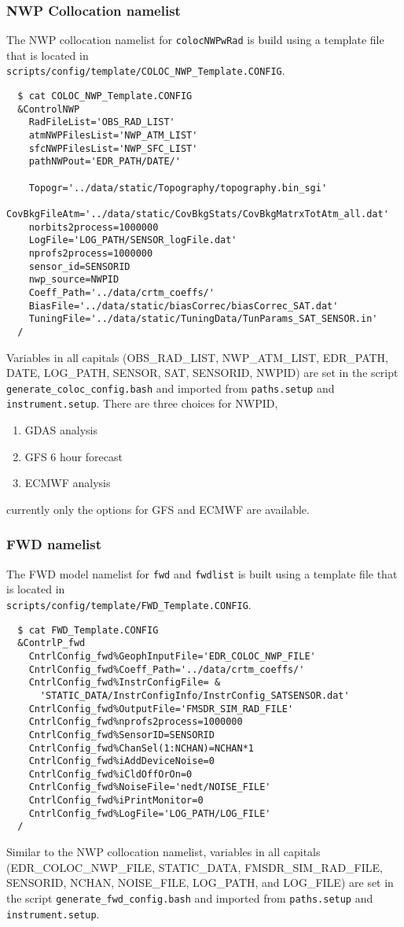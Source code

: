 \documentclass[10pt]{report}
\begin{document}
\subsubsection{NWP Collocation namelist}\label{ssec:NWPColoc}
The NWP collocation namelist for {\tt colocNWPwRad} is build using a template 
file that is located in \\
 {\tt scripts/config/template/COLOC\_NWP\_Template.CONFIG}.
\begin{verbatim}
  $ cat COLOC_NWP_Template.CONFIG
  &ControlNWP
    RadFileList='OBS_RAD_LIST'
    atmNWPFilesList='NWP_ATM_LIST'
    sfcNWPFilesList='NWP_SFC_LIST'
    pathNWPout='EDR_PATH/DATE/'

    Topogr='../data/static/Topography/topography.bin_sgi'
    CovBkgFileAtm='../data/static/CovBkgStats/CovBkgMatrxTotAtm_all.dat'
    norbits2process=1000000
    LogFile='LOG_PATH/SENSOR_logFile.dat'
    nprofs2process=1000000
    sensor_id=SENSORID
    nwp_source=NWPID
    Coeff_Path='../data/crtm_coeffs/'
    BiasFile='../data/static/biasCorrec/biasCorrec_SAT.dat'
    TuningFile='../data/static/TuningData/TunParams_SAT_SENSOR.in'
  /
\end{verbatim}
Variables in all capitals (OBS\_RAD\_LIST, NWP\_ATM\_LIST, EDR\_PATH, DATE, 
LOG\_PATH, SENSOR, SAT, SENSORID, NWPID) are set in the script {\tt generate\_coloc\_config.bash} and imported from {\tt paths.setup} and 
{\tt instrument.setup}.  
There are three choices for NWPID, 
\begin{enumerate}
\item GDAS analysis
\item GFS 6 hour forecast
\item ECMWF analysis
\end{enumerate}
currently only the options for GFS and ECMWF are available.
\subsubsection{FWD namelist}
The FWD model namelist for {\tt fwd} and {\tt fwdlist} is built 
using a template file that is located in \\
 {\tt scripts/config/template/FWD\_Template.CONFIG}.
\begin{verbatim}
  $ cat FWD_Template.CONFIG
  &ContrlP_fwd
    CntrlConfig_fwd%GeophInputFile='EDR_COLOC_NWP_FILE'
    CntrlConfig_fwd%Coeff_Path='../data/crtm_coeffs/'
    CntrlConfig_fwd%InstrConfigFile= &
      'STATIC_DATA/InstrConfigInfo/InstrConfig_SATSENSOR.dat'
    CntrlConfig_fwd%OutputFile='FMSDR_SIM_RAD_FILE'
    CntrlConfig_fwd%nprofs2process=1000000
    CntrlConfig_fwd%SensorID=SENSORID
    CntrlConfig_fwd%ChanSel(1:NCHAN)=NCHAN*1
    CntrlConfig_fwd%iAddDeviceNoise=0
    CntrlConfig_fwd%iCldOffOrOn=0
    CntrlConfig_fwd%NoiseFile='nedt/NOISE_FILE'
    CntrlConfig_fwd%iPrintMonitor=0
    CntrlConfig_fwd%LogFile='LOG_PATH/LOG_FILE'
  /
\end{verbatim}
Similar to the NWP collocation namelist, variables in all capitals (EDR\_COLOC\_NWP\_FILE, STATIC\_DATA, FMSDR\_SIM\_RAD\_FILE, SENSORID, 
NCHAN, NOISE\_FILE, LOG\_PATH, and LOG\_FILE) are set in the script {\tt generate\_fwd\_config.bash} and imported from {\tt paths.setup} and 
{\tt instrument.setup}.  
\end{document}
